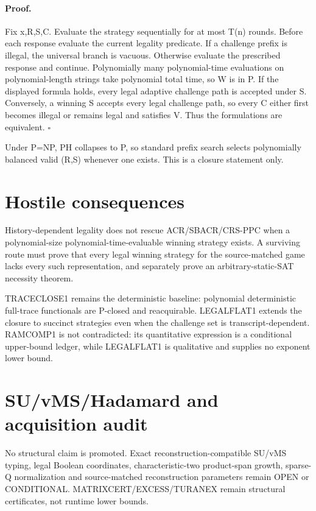 \documentclass[11pt]{article}
\begin{document}
\paragraph{Proof.}
Fix x,R,S,C. Evaluate the strategy sequentially for at most T(n) rounds. Before each response evaluate the current legality predicate. If a challenge prefix is illegal, the universal branch is vacuous. Otherwise evaluate the prescribed response and continue. Polynomially many polynomial-time evaluations on polynomial-length strings take polynomial total time, so W is in P. If the displayed formula holds, every legal adaptive challenge path is accepted under S. Conversely, a winning S accepts every legal challenge path, so every C either first becomes illegal or remains legal and satisfies V. Thus the formulations are equivalent. \(\square\)

Under P=NP, PH collapses to P, so standard prefix search selects polynomially balanced valid (R,S) whenever one exists. This is a closure statement only.

\section*{Hostile consequences}
History-dependent legality does not rescue ACR/SBACR/CRS-PPC when a polynomial-size polynomial-time-evaluable winning strategy exists. A surviving route must prove that every legal winning strategy for the source-matched game lacks every such representation, and separately prove an arbitrary-static-SAT necessity theorem.

TRACECLOSE1 remains the deterministic baseline: polynomial deterministic full-trace functionals are P-closed and reacquirable. LEGALFLAT1 extends the closure to succinct strategies even when the challenge set is transcript-dependent. RAMCOMP1 is not contradicted: its quantitative expression is a conditional upper-bound ledger, while LEGALFLAT1 is qualitative and supplies no exponent lower bound.

\section*{SU/vMS/Hadamard and acquisition audit}
No structural claim is promoted. Exact reconstruction-compatible SU/vMS typing, legal Boolean coordinates, characteristic-two product-span growth, sparse-Q normalization and source-matched reconstruction parameters remain OPEN or CONDITIONAL. MATRIXCERT/EXCESS/TURANEX remain structural certificates, not runtime lower bounds.
\end{document}
